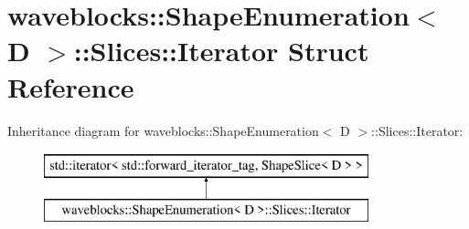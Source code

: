 \hypertarget{structwaveblocks_1_1_shape_enumeration_1_1_slices_1_1_iterator}{}\section{waveblocks\+:\+:Shape\+Enumeration$<$ D $>$\+:\+:Slices\+:\+:Iterator Struct Reference}
\label{structwaveblocks_1_1_shape_enumeration_1_1_slices_1_1_iterator}
Inheritance diagram for waveblocks\+:\+:Shape\+Enumeration$<$ D $>$\+:\+:Slices\+:\+:Iterator\+:\begin{figure}[H]
\begin{center}
\leavevmode
\includegraphics[height=2.000000cm]{structwaveblocks_1_1_shape_enumeration_1_1_slices_1_1_iterator}
\end{center}
\end{figure}
